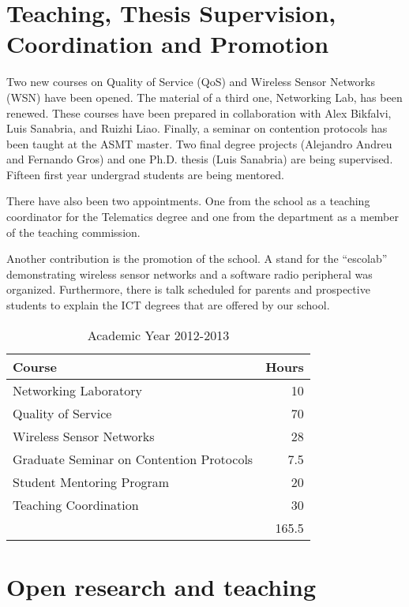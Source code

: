 \documentclass[a4paper,twocolumns]{article}%
\begin{document}
\section{Teaching, Thesis Supervision, Coordination and Promotion}

Two new courses on Quality of Service (QoS) and Wireless Sensor Networks (WSN) have been opened.
The material of a third one, Networking Lab, has been renewed.
These courses have been prepared in collaboration with Alex Bikfalvi, Luis Sanabria, and Ruizhi Liao.
Finally, a seminar on contention protocols has been taught at the ASMT master.
Two final degree projects (Alejandro Andreu and Fernando Gros) and one Ph.D. thesis (Luis Sanabria) are being supervised.
Fifteen first year undergrad students are being mentored.

There have also been two appointments.
One from the school as a teaching coordinator for the Telematics degree and one from the department as a member of the teaching commission.

Another contribution is the promotion of the school.
A stand for the ``escolab'' demonstrating wireless sensor networks and a software radio peripheral was organized.
Furthermore, there is talk scheduled for parents and prospective students to explain the ICT degrees that are offered by our school.

\begin{table}
\begin{center}
\begin{tabular}{ l r }
  Course & Hours \\
  \hline
  Networking Laboratory & 10 \\
  Quality of Service &  70\\
  Wireless Sensor Networks & 28 \\
  Graduate Seminar on Contention Protocols & 7.5 \\
  Student Mentoring Program & 20 \\
  Teaching Coordination & 30 \\
  \hline
  & 165.5 \\
\end{tabular}
\end{center}
\caption{Academic Year 2012-2013}
\end{table}

\section{Open research and teaching}
\end{document}
